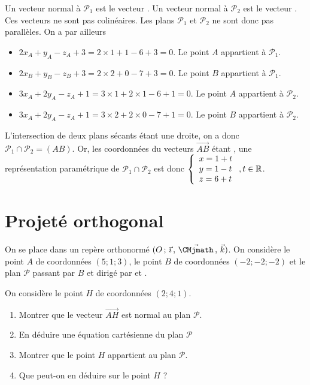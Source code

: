 \documentclass[11pt,fleqn, openany]{book} %
\begin{document}
\begin{solution}Un vecteur normal à $\mathcal{P}_1$ est le vecteur . Un vecteur normal à $\mathcal{P}_2$ est le vecteur . Ces vecteurs ne sont pas colinéaires. Les plans $\mathcal{P}_1$ et $\mathcal{P}_2$ ne sont donc pas parallèles. On a par ailleurs

\begin{itemize}
\item $2x_A+y_A-z_A+3=2\times 1 + 1 -6 +3 =0$. Le point $A$ appartient à $\mathcal{P}_1$.
\item $2x_B+y_B-z_B+3=2\times 2 + 0 -7 +3 =0$. Le point $B$ appartient à $\mathcal{P}_1$.
\item $3x_A+2y_A-z_A+1=3\times 1 + 2 \times 1 - 6 + 1 =0$. Le point $A$ appartient à $\mathcal{P}_2$.
\item $3x_A+2y_A-z_A+1=3\times 2 + 2 \times 0 - 7 + 1 =0$. Le point $B$ appartient à $\mathcal{P}_2$.
\end{itemize} 

L'intersection de deux plans sécants étant une droite, on a donc $\mathcal{P}_1 \cap \mathcal{P}_2=(AB)$. Or, les coordonnées du vecteurs $\overrightarrow{AB}$ étant , une représentation paramétrique de $\mathcal{P}_1 \cap \mathcal{P}_2$ est donc $\left\{\renewcommand{\arraystretch}{1}\renewcommand{\arraystretch}{1}\begin{array}{l} x = 1 +t \\ y = 1-t \\ z = 6+t 
\end{array}\right. , t\in \mathbb{R}$.\end{solution}


\section*{Projeté orthogonal}

\begin{exercise}[topic=geom15]On se place dans un repère orthonormé $\Oijk$. On considère le point $A$ de coordonnées $(5;1;3)$, le point $B$ de coordonnées $(-2;-2;-2)$ et le plan $\mathcal{P}$ passant par $B$ et dirigé par  et .
\vspace{-0.5cm}

On considère le point $H$ de coordonnées $(2;4;1)$.
\begin{enumerate}
\item Montrer que le vecteur $\overrightarrow{AH}$ est normal au plan $\mathcal{P}$.
\item En déduire une équation cartésienne du plan $\mathcal{P}$
\item Montrer que le point $H$ appartient au plan $\mathcal{P}$. 
\item Que peut-on en déduire sur le point $H$ ?
\end{enumerate}\end{exercise}
\end{document}

